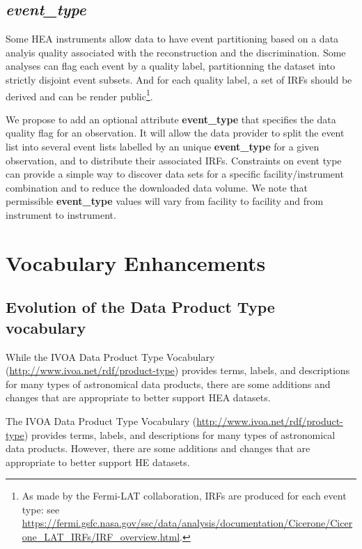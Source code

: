 \documentclass[11pt,a4paper]{ivoa}
\begin{document}
\subsection{{\em event\_type}}

Some \gls{HEA} instruments allow data to have event partitioning based on a data analyis quality associated with the reconstruction and the discrimination. Some analyses can flag each event by a quality label, partitionning the dataset into strictly disjoint event subsets. And for each quality label, a set of \glspl{IRF} should be derived and can be render public\footnote{As made by the Fermi-LAT collaboration, \glspl{IRF} are produced for each event type: see \url{https://fermi.gsfc.nasa.gov/ssc/data/analysis/documentation/Cicerone/Cicerone_LAT_IRFs/IRF_overview.html}.}.

We propose to add an optional attribute {\bf event\_type} that specifies the data quality flag for an observation. It will allow the data provider to split the event list into several event lists labelled by an unique {\bf event\_type} for a given observation, and to distribute their associated \glspl{IRF}. Constraints on event type can provide a simple way to discover data sets for a specific facility/instrument combination and to reduce the downloaded data volume. We note that permissible {\bf event\_type} values will vary from facility to facility and from instrument to instrument.


\section{Vocabulary Enhancements}
\label{sec:voc}

\subsection{Evolution of the Data Product Type vocabulary}
\label{sec:voc_product_type}

While the IVOA Data Product Type Vocabulary (\url{http://www.ivoa.net/rdf/product-type}) provides terms, labels, and descriptions for many types of astronomical data products, there are some additions and changes that are appropriate to better support HEA datasets.

The IVOA Data Product Type Vocabulary (\url{http://www.ivoa.net/rdf/product-type}) provides terms, labels, and descriptions for many types of astronomical data products. However, there are some additions and changes that are appropriate to better support \gls{HE} datasets.
\end{document}

